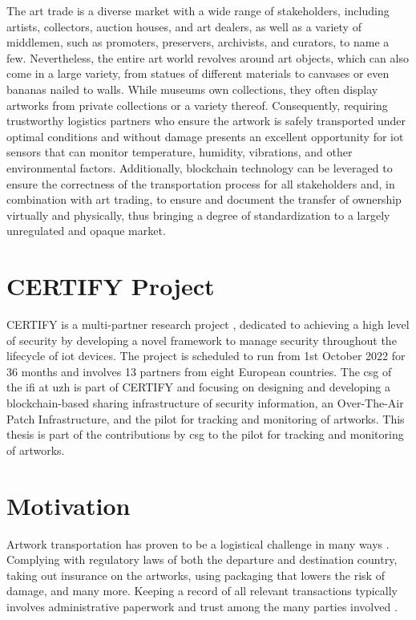 The art trade is a diverse market with a wide range of stakeholders, including artists, collectors, auction houses, and art dealers, as well as a variety of middlemen, such as promoters, preservers, archivists, and curators, to name a few. Nevertheless, the entire art world revolves around art objects, which can also come in a large variety, from statues of different materials to canvases or even bananas nailed to walls. While museums own collections, they often display artworks from private collections or a variety thereof. Consequently, requiring trustworthy logistics partners who ensure the artwork is safely transported under optimal conditions and without damage presents an excellent opportunity for \gls{iot} sensors that can monitor temperature, humidity, vibrations, and other environmental factors. Additionally, blockchain technology can be leveraged to ensure the correctness of the transportation process for all stakeholders and, in combination with art trading, to ensure and document the transfer of ownership virtually and physically, thus bringing a degree of standardization to a largely unregulated and opaque market. \cite{certify}

\section{CERTIFY Project}
\label{sec:certify}
CERTIFY is a multi-partner research project \cite{certify}, dedicated to achieving a high level of security by developing a novel framework to manage security throughout the lifecycle of \gls{iot} devices. The project is scheduled to run from 1st October 2022 for 36 months and involves 13 partners from eight European countries. The \gls{csg} of the \gls{ifi} at \gls{uzh} is part of CERTIFY and focusing on designing and developing a blockchain-based sharing infrastructure of security information, an Over-The-Air Patch Infrastructure, and the pilot for tracking and monitoring of artworks. This thesis is part of the contributions by \gls{csg} to the pilot for tracking and monitoring of artworks.

\section{Motivation}
Artwork transportation has proven to be a logistical challenge in many ways \cite{artintransit}. Complying with regulatory laws of both the departure and destination country, taking out insurance on the artworks, using packaging that lowers the risk of damage, and many more. Keeping a record of all relevant transactions typically involves administrative paperwork and trust among the many parties involved \cite{artintransit}.

